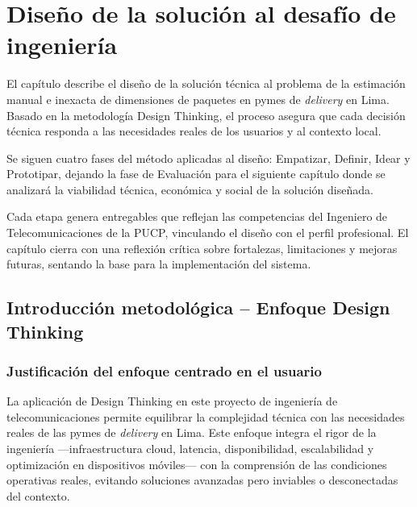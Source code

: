 
\chapter{Diseño de la solución al desafío de ingeniería}


El capítulo describe el diseño de la solución técnica al problema de la estimación manual e inexacta de dimensiones de paquetes en pymes de \textit{delivery} en Lima. Basado en la metodología Design Thinking, el proceso asegura que cada decisión técnica responda a las necesidades reales de los usuarios y al contexto local.

Se siguen cuatro fases del método aplicadas al diseño: Empatizar, Definir, Idear y Prototipar, dejando la fase de Evaluación para el siguiente capítulo donde se analizará la viabilidad técnica, económica y social de la solución diseñada.

Cada etapa genera entregables que reflejan las competencias del Ingeniero de Telecomunicaciones de la PUCP, vinculando el diseño con el perfil profesional. El capítulo cierra con una reflexión crítica sobre fortalezas, limitaciones y mejoras futuras, sentando la base para la implementación del sistema.

\section{Introducción metodológica – Enfoque Design Thinking}

\subsection{Justificación del enfoque centrado en el usuario}

La aplicación de Design Thinking en este proyecto de ingeniería de telecomunicaciones permite equilibrar la complejidad técnica con las necesidades reales de las pymes de \textit{delivery} en Lima. Este enfoque integra el rigor de la ingeniería —infraestructura cloud, latencia, disponibilidad, escalabilidad y optimización en dispositivos móviles— con la comprensión de las condiciones operativas reales, evitando soluciones avanzadas pero inviables o desconectadas del contexto. 


